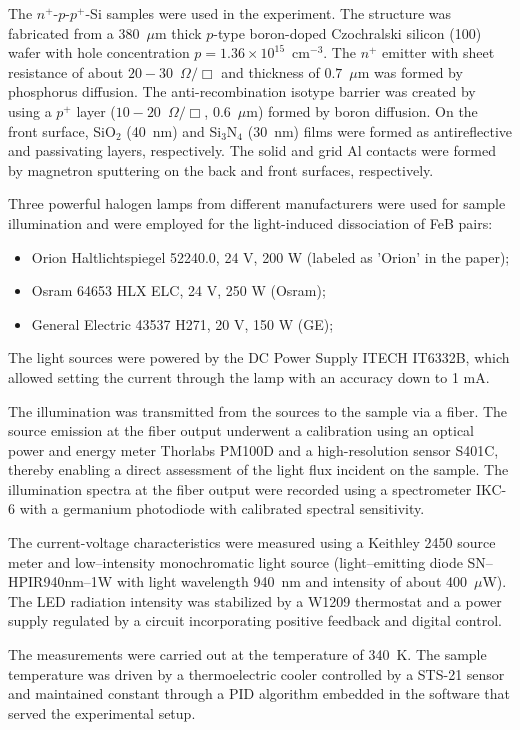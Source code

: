 \documentclass{WileyMSP-template}
\begin{document}
The $n^+$-$p$-$p^+$-Si samples were used in the experiment.
The structure was fabricated from a 380~$\mu$m thick $p$-type boron-doped
Czochralski silicon (100) wafer with hole concentration $p=1.36\times10^{15}$~cm$^{-3}$.
The $n^+$ emitter with sheet resistance of about $20-30$~$\Omega/\Box$
and  thickness of $0.7$~$\mu$m was formed by phosphorus diffusion.
The anti-recombination isotype barrier was created by using a $p^+$
layer ($10-20$~$\Omega/\Box$, $0.6$~$\mu$m) formed by boron diffusion.
On the front surface, SiO$_2$ (40~nm) and Si$_3$N$_4$ (30~nm) films were formed as antireflective and passivating layers, respectively.
The solid and grid Al contacts were formed by magnetron sputtering on the back and front surfaces, respectively.

Three powerful halogen lamps from different manufacturers were used for sample illumination and were employed for the light-induced dissociation of FeB pairs:
\begin{itemize}
  \item Orion Haltlichtspiegel 52240.0, 24 V, 200 W (labeled as 'Orion' in the paper);
  \item Osram 64653 HLX ELC, 24 V, 250 W (Osram);
  \item General Electric 43537 H271, 20 V, 150 W (GE);
\end{itemize}
The light sources were powered by the DC Power Supply ITECH IT6332B, which allowed setting the current through the lamp with an accuracy down to 1 mA.

The illumination was transmitted from the sources to the sample via a fiber.
The source emission at the fiber output underwent a calibration using an optical power and energy meter Thorlabs PM100D and a high-resolution sensor S401C,
thereby enabling a direct assessment of the light flux incident on the sample.
The illumination spectra at the fiber output were recorded using a spectrometer IKC-6 with a germanium photodiode with calibrated spectral sensitivity.

The current-voltage characteristics were measured using a Keithley 2450 source meter and
low--intensity monochromatic light source (light--emitting diode SN--HPIR940nm--1W with light wavelength 940~nm and intensity of about 400~$\mu$W).
The LED radiation intensity was stabilized by a W1209 thermostat and a power supply regulated by a circuit incorporating positive feedback and digital control.

The measurements were carried out at the temperature of 340~K.
The sample temperature was driven by a thermoelectric cooler
controlled by a STS-21 sensor
and maintained constant through a PID algorithm embedded in the software that served the experimental setup.
\end{document}

